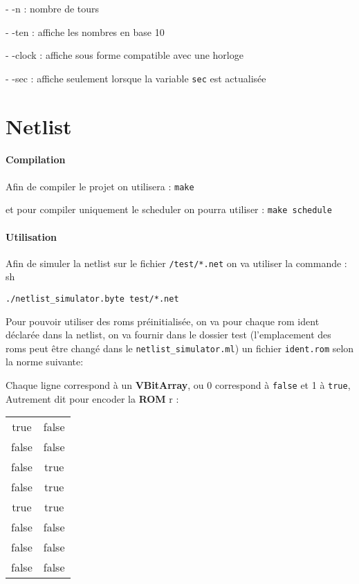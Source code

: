 \documentclass{article}
\begin{document}
- -n : nombre de tours

- -ten : affiche les nombres en base 10

- -clock : affiche sous forme compatible avec une horloge

- -sec : affiche seulement lorsque la variable \verb|sec| est actualisée

\part*{Netlist}

\subsection*{Compilation}

Afin de compiler le projet on utilisera : \verb|make| 

et pour compiler uniquement le scheduler on pourra utiliser : \verb|make schedule| 


\subsection*{Utilisation}

Afin de simuler la netlist sur le fichier \verb|/test/*.net| on va utiliser la commande : 
sh
\begin{verbatim}./netlist_simulator.byte test/*.net\end{verbatim}

Pour pouvoir utiliser des roms préinitialisée, on va pour chaque rom ident déclarée dans la netlist,
on va fournir dans le dossier test (l'emplacement des roms peut être changé dans le \verb|netlist_simulator.ml|)
un fichier \verb|ident.rom| selon la norme suivante:

Chaque ligne correspond à un \textbf{VBitArray}, ou 0 correspond à \verb|false| et 1 à \verb|true|, Autrement dit pour encoder la \textbf{ROM} r : 

\begin{tabular}{| c | c |}
    true & false \\
    false & false \\
    false & true \\
    false & true \\
    true & true \\
    false & false \\
    false & false \\
    false & false \\
\end{tabular}
\end{document}
